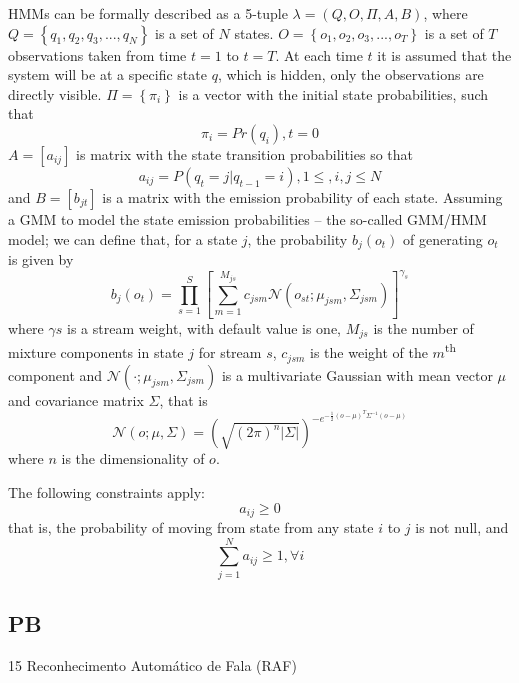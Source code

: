\ac{HMM}s can be formally described as a 5-tuple $\lambda = \left (Q, O, \Pi, A, B\right )$, where $Q = \left \{q_1, q_2, q_3, ..., q_N\right \}$  is a set of $N$ states. $O = \left \{o_1, o_2, o_3, ..., o_T\right \}$ is a set of $T$ observations taken from time $t = 1$ to $t = T$. At each time $t$ it is assumed that the system will be at a specific state $q$, which is hidden, only the observations are directly visible. $\Pi = \left \{\pi_i \right \}$ is a vector with the initial state probabilities, such that
\begin{equation}
\pi_i = Pr(q_i), t = 0
\end{equation}
$A = [a_{ij}]$ is matrix with the state transition probabilities so that
\begin{equation}
a_{ij} = P(q_t = j | q_{t-1} = i),  1 \leq, i, j \leq N
\end{equation}
and $B = [b_{jt}]$ is a matrix with the emission probability of each state. Assuming a \ac{GMM} to model the state emission probabilities -- the so-called GMM/HMM model; we can define that, for a state $j$, the probability $b_j(o_t)$ of generating $o_t$ is given by
\begin{equation}
 b_j(o_t) = \prod_{s=1}^{S}\left [ \sum_{m=1}^{M_{js}} c_{jsm}\mathcal{N}(o_{st}; \mu_{jsm}, \Sigma_{jsm}) \right ]^{\gamma_s}
\end{equation}
where $\gamma s$ is a stream weight, with default value is one, $M_{js}$ is the number of mixture components in state $j$ for stream $s$, $c_{jsm}$ is the weight of the $m$\textsuperscript{th} component and $\mathcal{N}(\cdot; \mu_{jsm}, \Sigma_{jsm})$ is a multivariate Gaussian with mean vector $\mu$ and covariance matrix $\Sigma$, that is
\begin{equation}
 \mathcal{N}(o; \mu, \Sigma) = (\sqrt{(2\pi)^{n}\left |\Sigma\right |})^{-e^{-\frac{1}{2}(o-\mu)^{T}\Sigma^{-1}(o-\mu)}}
\end{equation}
where $n$ is the dimensionality of $o$.

The following constraints apply:
\begin{equation}
a_{ij} \geq 0
\end{equation}
that is, the probability of moving from state from any state $i$ to $j$ is not null, and
\begin{equation}
\sum_{j=1}^{N} a_{ij} \geq 1, \forall i
\end{equation}

\subsection{PB}
15 Reconhecimento Autom\'atico de Fala (RAF)

